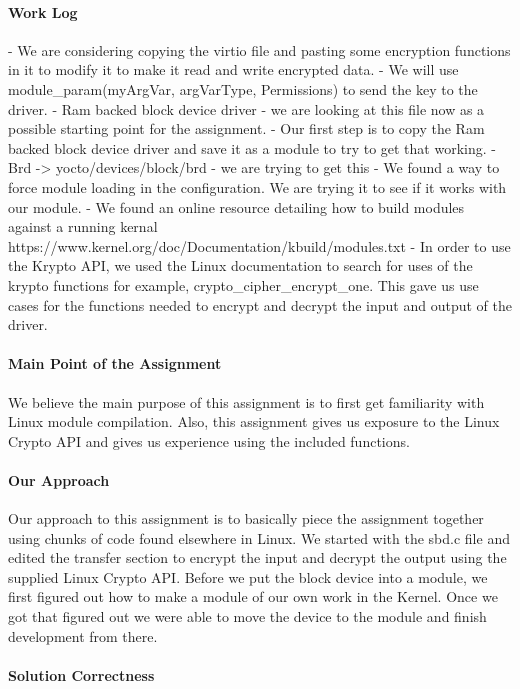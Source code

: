 \documentclass[titlepage,draftclsnofoot,onecolumn]{article}
\begin{document}
\paragraph{Work Log}
- We are considering copying the virtio file and pasting some encryption functions in it to modify it to make it read and write encrypted data.
- We will use module\_param(myArgVar, argVarType, Permissions) to send the key to the driver.
- Ram backed block device driver - we are looking at this file now as a possible starting point for the assignment.
- Our first step is to copy the Ram backed block device driver and save it as a module to try to get that working.
- Brd -> yocto/devices/block/brd - we are trying to get this
- We found a way to force module loading in the configuration. We are trying it to see if it works with our module.
- We found an online resource detailing how to build modules against a running kernal https://www.kernel.org/doc/Documentation/kbuild/modules.txt
- In order to use the Krypto API, we used the Linux documentation to search for uses of the krypto functions for example, crypto\_cipher\_encrypt\_one. This gave us use cases for the functions needed to encrypt and decrypt the input and output of the driver.

\paragraph{Main Point of the Assignment}
We believe the main purpose of this assignment is to first get familiarity with Linux module compilation. Also, this assignment gives us exposure to the Linux Crypto API and gives us experience using the included functions.

\paragraph{Our Approach}
Our approach to this assignment is to basically piece the assignment together using chunks of code found elsewhere in Linux. We started with the sbd.c file and edited the transfer section to encrypt the input and decrypt the output using the supplied Linux Crypto API. Before we put the block device into a module, we first figured out how to make a module of our own work in the Kernel. Once we got that figured out we were able to move the device to the module and finish development from there.

\paragraph{Solution Correctness}
\end{document}
